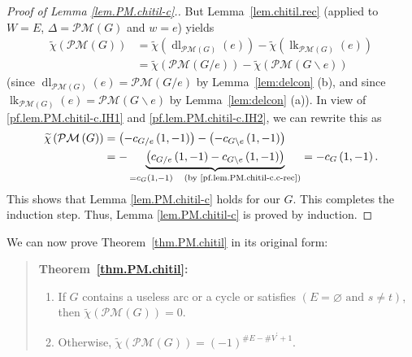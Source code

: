 \documentclass[12pt]{amsart}
\theoremstyle{definition}
\newenvironment{statement}{\begin{quote}}{\end{quote}}
\DeclareMathOperator{\lk}{lk}
\DeclareMathOperator{\dl}{dl}
\newcommand{\tup}[1]{\left( #1 \right)}
\newcommand{\chitil}{\widetilde{\chi}}
\newcommand{\Pm}[1]{\mathcal{PM}\left(#1\right)}
\newcommand{\NS}{V^{\prime}}
\begin{document}
\begin{proof}[Proof of Lemma \ref{lem.PM.chitil-c}.]
But Lemma~\ref{lem.chitil.rec} (applied to $W=E$, $\Delta=\Pm{G}$
and $w=e$) yields
\begin{align*}
\widetilde{\chi}\left(  \Pm{G}\right)   &  =\widetilde{\chi}\left(
\dl_{\Pm{G}}\left(  e\right)  \right)  -\widetilde{\chi}\left(
\lk_{\Pm{G}}\left(  e\right)  \right)  \\
&  =\widetilde{\chi}\left(  \Pm{G/e}  \right)
-\widetilde{\chi}\left(  \Pm{G \backslash e}  \right)
\end{align*}
(since $\dl_{\Pm{G}}\left(  e\right)  = \Pm{G/e}$
by Lemma~\ref{lem:delcon} (b), and since
$\lk_{\Pm{G}}\left(  e\right)  = \Pm{G \backslash e}  $ by
Lemma~\ref{lem:delcon} (a)). In view of \eqref{pf.lem.PM.chitil-c.IH1} and
\eqref{pf.lem.PM.chitil-c.IH2}, we can rewrite this as
\begin{align*}
\widetilde{\chi}\left(  \Pm{G}\right)    & =\left(  -c_{G/e}\left(
1,-1\right)  \right)  -\left(  -c_{G\backslash e}\left(  1,-1\right)  \right)
\\
& =-\underbrace{\left(  c_{G/e}\left(  1,-1\right)  -c_{G\backslash e}\left(
1,-1\right)  \right)  }_{=c_{G}\left(  1,-1\right)  \quad \text{(by
\eqref{pf.lem.PM.chitil-c.c-rec})}}=-c_{G}\left(  1,-1\right)  .
\end{align*}
This shows that Lemma \ref{lem.PM.chitil-c} holds for our $G$. This completes
the induction step. Thus, Lemma \ref{lem.PM.chitil-c} is proved by induction.
\end{proof}

We can now prove Theorem~\ref{thm.PM.chitil} in its original form:

\begin{statement} \textbf{Theorem~\ref{thm.PM.chitil}:}
\begin{enumerate}
    \item[(a)] If $G$ contains a useless arc or a cycle or satisfies $\tup{E = \varnothing \text{ and } s \neq t}$, then $\chitil\tup{\Pm{G}} = 0$.
    \item[(b)] Otherwise, $\chitil\tup{\Pm{G}} = \tup{-1}^{\# E - \# \NS + 1}$.
\end{enumerate}
\end{statement}
\end{document}

